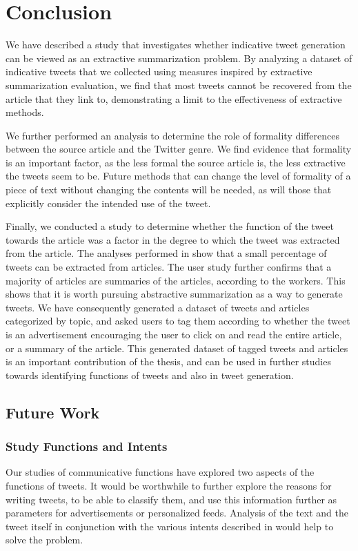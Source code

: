 \chapter{Conclusion}
\label{chap:conclusion}

We have described a study that investigates whether indicative tweet generation can be viewed as an extractive summarization problem. By analyzing a dataset of indicative tweets that we collected using measures inspired by extractive summarization evaluation, we find that most tweets cannot be recovered from the article that they link to, demonstrating a limit to the effectiveness of extractive methods.

We further performed an analysis to determine the role of formality differences between the source article and the Twitter genre. We find evidence that formality is an important factor, as the less formal the source article is, the less extractive the tweets seem to be. Future methods that can change the level of formality of a piece of text without changing the contents will be needed, as will those that explicitly consider the intended use of the tweet.

Finally, we conducted a study to determine whether the function of the tweet towards the article was a factor in the degree to which the tweet was extracted from the article. The  analyses performed in  show that a small percentage of tweets can be extracted from articles. The user study further confirms that a majority of articles are summaries of the articles, according to the workers. This shows that it is worth pursuing abstractive summarization as a way to generate tweets. We have consequently generated a dataset of tweets and articles categorized by topic, and asked users to tag them according to whether the tweet is an advertisement encouraging the user to click on and read the entire article, or a summary of the article. This generated dataset of tagged tweets and articles is an important contribution of the thesis, and can be used in further studies towards identifying functions of tweets and also in tweet generation.

\section{Future Work}

\subsection{Study Functions and Intents}
Our studies of communicative functions have explored two aspects of the functions of tweets. It would be worthwhile to further explore the reasons for writing tweets, to be able to classify them, and use this information further as parameters for advertisements or personalized feeds. Analysis of the text and the tweet itself in conjunction with the various intents described in \cite{sinclair1996preliminary} would help to solve the problem.

